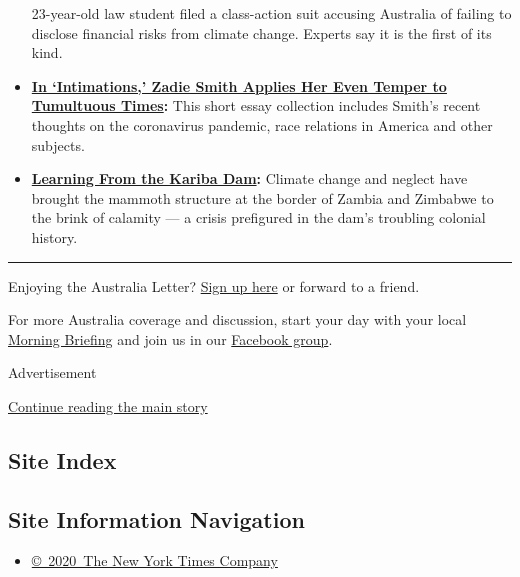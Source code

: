 \begin{itemize}
  23-year-old law student filed a class-action suit accusing Australia
  of failing to disclose financial risks from climate change. Experts
  say it is the first of its kind.
\item
  \textbf{\href{https://www.nytimes3xbfgragh.onion/2020/07/22/books/review-intimations-essays-zadie-smith.html}{In
  `Intimations,' Zadie Smith Applies Her Even Temper to Tumultuous
  Times}:} This short essay collection includes Smith's recent thoughts
  on the coronavirus pandemic, race relations in America and other
  subjects.
\item
  \textbf{\href{https://www.nytimes3xbfgragh.onion/interactive/2020/07/22/magazine/zambia-kariba-dam.html}{Learning
  From the Kariba Dam}:} Climate change and neglect have brought the
  mammoth structure at the border of Zambia and Zimbabwe to the brink of
  calamity --- a crisis prefigured in the dam's troubling colonial
  history.
\end{itemize}

\begin{center}\rule{0.5\linewidth}{\linethickness}\end{center}

Enjoying the Australia Letter?
\href{https://www.nytimes3xbfgragh.onion/newsletters/australia-letter?utm_source=ausend}{Sign
up here} or forward to a friend.

For more Australia coverage and discussion, start your day with your
local
\href{https://www.nytimes3xbfgragh.onion/interactive/2018/briefing/global-morning-briefing-newsletter-signup.html?utm_source=ausend}{Morning
Briefing} and join us in our
\href{https://www.facebookcorewwwi.onion/groups/nytaustralia/}{Facebook
group}.

Advertisement

\protect\hyperlink{after-bottom}{Continue reading the main story}

\hypertarget{site-index}{%
\subsection{Site Index}\label{site-index}}

\hypertarget{site-information-navigation}{%
\subsection{Site Information
Navigation}\label{site-information-navigation}}

\begin{itemize}
\tightlist
\item
  \href{https://help.nytimes3xbfgragh.onion/hc/en-us/articles/115014792127-Copyright-notice}{©~2020~The
  New York Times Company}
\end{itemize}

